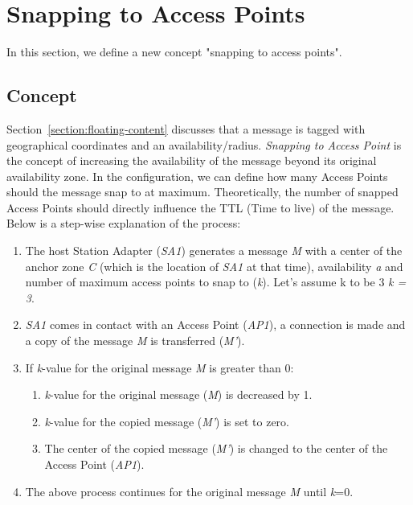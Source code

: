 \section{Snapping to Access Points}
In this section, we define a new concept "snapping to access points".
\subsection{Concept}
Section~\ref{section:floating-content} discusses that a message is tagged with geographical coordinates and an availability/radius. \textit{Snapping to Access Point} is the concept of increasing the availability of the message beyond its original availability zone. In the configuration, we can define how many Access Points should the message snap to at maximum. Theoretically, the number of snapped Access Points should directly influence the TTL (Time to live) of the message. Below is a step-wise explanation of the process:

	\begin{enumerate}
 	 \item The host Station Adapter (\textit{SA1}) generates a message \textit{M} with a center of the anchor zone \textit{C} (which is the location of \textit{SA1} at that time), availability \textit{a} and number of maximum access points to snap to (\textit{k}). Let's assume k to be 3 \textit{k = 3}.
 	 \item \textit{SA1} comes in contact with an Access Point (\textit{AP1}), a connection is made and a copy of the message \textit{M} is transferred (\textit{M'}).
 	 \item If \textit{k}-value for the original message \textit{M} is greater than 0:
 	 	\begin{enumerate}
 	 		\item \textit{k}-value for the original message (\textit{M}) is decreased by 1.
 	 		\item \textit{k}-value for the copied message (\textit{M'}) is set to zero.
 	 		\item The center of the copied message (\textit{M'}) is changed to the center of the Access Point (\textit{AP1}).
 	 	\end{enumerate}
 	 \item The above process continues for the original message \textit{M} until \textit{k}=0.
 	 \end{enumerate}

